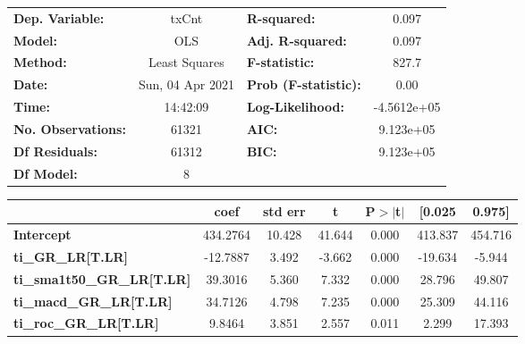 \begin{center}
\begin{tabular}{lclc}
\toprule
\textbf{Dep. Variable:}                 &      txCnt       & \textbf{  R-squared:         } &      0.097   \\
\textbf{Model:}                         &       OLS        & \textbf{  Adj. R-squared:    } &      0.097   \\
\textbf{Method:}                        &  Least Squares   & \textbf{  F-statistic:       } &      827.7   \\
\textbf{Date:}                          & Sun, 04 Apr 2021 & \textbf{  Prob (F-statistic):} &      0.00    \\
\textbf{Time:}                          &     14:42:09     & \textbf{  Log-Likelihood:    } & -4.5612e+05  \\
\textbf{No. Observations:}              &       61321      & \textbf{  AIC:               } &  9.123e+05   \\
\textbf{Df Residuals:}                  &       61312      & \textbf{  BIC:               } &  9.123e+05   \\
\textbf{Df Model:}                      &           8      & \textbf{                     } &              \\
\bottomrule
\end{tabular}
\begin{tabular}{lcccccc}
                                        & \textbf{coef} & \textbf{std err} & \textbf{t} & \textbf{P$> |$t$|$} & \textbf{[0.025} & \textbf{0.975]}  \\
\midrule
\textbf{Intercept}                      &     434.2764  &       10.428     &    41.644  &         0.000        &      413.837    &      454.716     \\
\textbf{ti\_GR\_LR[T.LR]}               &     -12.7887  &        3.492     &    -3.662  &         0.000        &      -19.634    &       -5.944     \\
\textbf{ti\_sma1t50\_GR\_LR[T.LR]}      &      39.3016  &        5.360     &     7.332  &         0.000        &       28.796    &       49.807     \\
\textbf{ti\_macd\_GR\_LR[T.LR]}         &      34.7126  &        4.798     &     7.235  &         0.000        &       25.309    &       44.116     \\
\textbf{ti\_roc\_GR\_LR[T.LR]}          &       9.8464  &        3.851     &     2.557  &         0.011        &        2.299    &       17.393     \\

\end{tabular}
\end{center}
